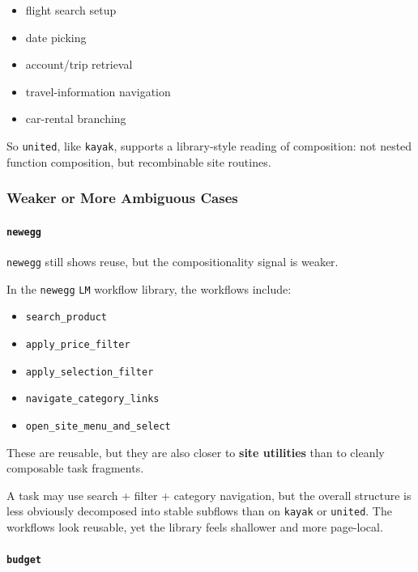 \begin{itemize}
\tightlist
\item
  flight search setup
\item
  date picking
\item
  account/trip retrieval
\item
  travel-information navigation
\item
  car-rental branching
\end{itemize}

So \texttt{united}, like \texttt{kayak}, supports a library-style
reading of composition: not nested function composition, but
recombinable site routines.

\subsubsection{Weaker or More Ambiguous
Cases}

\paragraph{\texorpdfstring{\texttt{newegg}}{newegg}}

\texttt{newegg} still shows reuse, but the compositionality signal is
weaker.

In the \texttt{newegg} \texttt{LM} workflow library,
the workflows include:

\begin{itemize}
\tightlist
\item
  \texttt{search\_product}
\item
  \texttt{apply\_price\_filter}
\item
  \texttt{apply\_selection\_filter}
\item
  \texttt{navigate\_category\_links}
\item
  \texttt{open\_site\_menu\_and\_select}
\end{itemize}

These are reusable, but they are also closer to \textbf{site utilities}
than to cleanly composable task fragments.

A task may use search + filter + category navigation, but the overall
structure is less obviously decomposed into stable subflows than on
\texttt{kayak} or \texttt{united}. The workflows look reusable, yet the
library feels shallower and more page-local.

\paragraph{\texorpdfstring{\texttt{budget}}{budget}}


